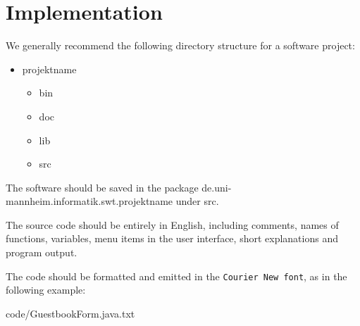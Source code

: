 \chapter{Implementation}

We generally recommend the following directory structure for a software project:

\begin{itemize}
\item projektname
  \begin{itemize}
  \item bin
  \item doc
  \item lib
  \item src
  \end{itemize}
\end{itemize}

The software should be saved in the package de.uni-mannheim.informatik.swt.projektname under src.

The source code should be entirely in English, including comments, names of functions, variables, menu items in the user interface, short explanations and program output.

The code should be formatted and emitted in the \texttt{Courier New font}, as in the following example:


{code/GuestbookForm.java.txt}
